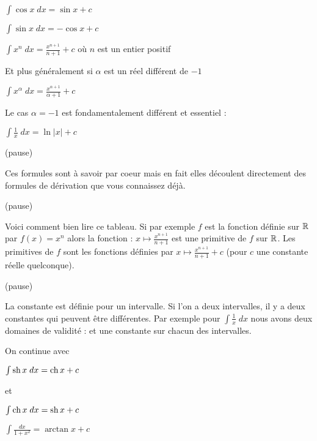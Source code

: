 \change

   $\int \cos x \; dx  = \sin x  + c$

\change

   $\int \sin x \; dx  = -\cos x  + c$  

\change

   $\int x^n \; dx = \frac{x^{n+1}}{n+1} + c$  où $n$ est un entier positif

\change

Et plus généralement si $\alpha$ est un réel différent de $-1$

   $\int x^\alpha \; dx = \frac{x^{\alpha+1}}{\alpha+1} + c$  


\change

Le cas $\alpha=-1$ est fondamentalement différent et essentiel :

   $\int \frac 1x \; dx  = \ln |x|  + c$  



(pause)

Ces formules sont à savoir par coeur mais en fait elles découlent 
directement des formules de dérivation que vous connaissez déjà.

(pause)


Voici comment bien lire ce tableau. Si par exemple $f$ est la fonction définie sur $\mathbb{R}$ par $f(x)=x^n$
alors la fonction : $x \mapsto \frac{x^{n+1}}{n+1}$ est une primitive de $f$ sur $\mathbb{R}$. Les primitives
de $f$ sont les fonctions définies par $x \mapsto \frac{x^{n+1}}{n+1}+c$ (pour $c$ une constante réelle quelconque).

% 


(pause)

La constante est définie pour un intervalle. Si l'on a deux intervalles, il y a 
deux constantes qui peuvent être différentes. Par exemple pour $\int \frac 1x \; dx$ nous avons deux domaines de validité :
et une constante sur chacun des intervalles.




\diapo

On continue avec 

   $\int\mathop{\mathrm{sh}}\nolimits x \; dx=\mathop{\mathrm{ch}}\nolimits x+c$

et 

   $\int \mathop{\mathrm{ch}}\nolimits x \; dx=\mathop{\mathrm{sh}}\nolimits x+c$ 

\change

   $\int \frac{dx}{1+x^2}= \arctan x+c$


